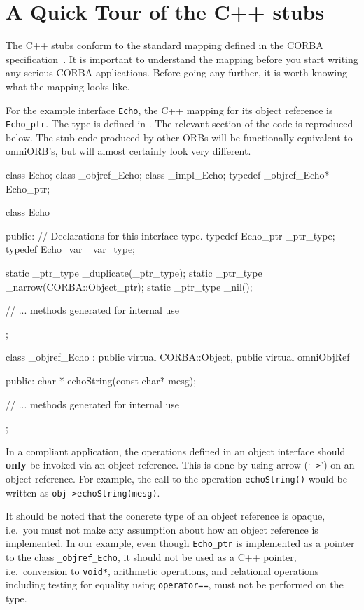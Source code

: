 \documentclass[11pt,twoside,a4paper]{book}
\newcommand{\type}[1]{\texttt{#1}}
\newcommand{\intf}[1]{\texttt{#1}}
\newcommand{\code}[1]{\texttt{#1}}
\newcommand{\op}[1]{\texttt{#1()}}
\newcommand{\file}{\begingroup \urlstyle{tt}\Url}
\begin{document}
\section{A Quick Tour of the C++ stubs}

The C++ stubs conform to the standard mapping defined in the CORBA
specification~\cite{cxxmapping}. It is important to understand the
mapping before you start writing any serious CORBA applications.
Before going any further, it is worth knowing what the mapping looks
like.

For the example interface \intf{Echo}, the C++ mapping for its object
reference is \type{Echo\_ptr}. The type is defined in \file{echo.hh}.
The relevant section of the code is reproduced below. The stub code
produced by other ORBs will be functionally equivalent to omniORB's,
but will almost certainly look very different.

\begin{cxxlisting}
class Echo;
class _objref_Echo;
class _impl_Echo;
typedef _objref_Echo* Echo_ptr;

class Echo {
public:
  // Declarations for this interface type.
  typedef Echo_ptr _ptr_type;
  typedef Echo_var _var_type;

  static _ptr_type _duplicate(_ptr_type);
  static _ptr_type _narrow(CORBA::Object_ptr);
  static _ptr_type _nil();

  // ... methods generated for internal use
};

class _objref_Echo :
  public virtual CORBA::Object, public virtual omniObjRef {
public:
  char * echoString(const char* mesg);

  // ... methods generated for internal use
};
\end{cxxlisting}

In a compliant application, the operations defined in an object
interface should \textbf{only} be invoked via an object reference.
This is done by using arrow (`\code{->}') on an object reference.
For example, the call to the operation \op{echoString} would be
written as \code{obj->echoString(mesg)}.

It should be noted that the concrete type of an object reference is
opaque, i.e.\ you must not make any assumption about how an object
reference is implemented. In our example, even though \type{Echo\_ptr}
is implemented as a pointer to the class \type{\_objref\_Echo}, it
should not be used as a C++ pointer, i.e.\ conversion to \type{void*},
arithmetic operations, and relational operations including testing for
equality using \code{operator==}, must not be performed on the type.
\end{document}
